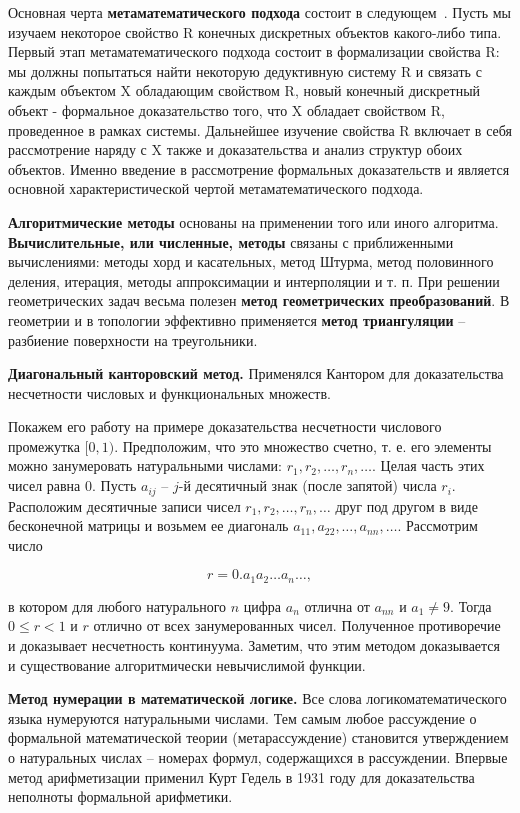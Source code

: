 Основная черта \textbf{метаматематического подхода} состоит в следующем~\cite{матиясевич1975метаматематическом}. Пусть мы изучаем некоторое свойство R конечных дискретных объектов какого-либо типа. Первый этап метаматематического подхода состоит в формализации свойства R: мы должны попытаться найти некоторую дедуктивную систему R и связать с каждым объектом X обладающим свойством R, новый конечный дискретный объект - формальное доказательство того, что X обладает свойством R, проведенное в рамках системы. Дальнейшее изучение свойства R включает в себя рассмотрение наряду с X также и доказательства и анализ структур обоих объектов. Именно введение в рассмотрение формальных доказательств и является основной характеристической чертой метаматематического подхода. 

\textbf{Алгоритмические методы} основаны на применении того или иного алгоритма. \textbf{Вычислительные, или численные, методы} связаны с приближенными вычислениями: методы хорд и касательных, метод Штурма, метод половинного деления, итерация, методы аппроксимации и интерполяции и т. п. При решении геометрических задач весьма полезен \textbf{метод геометрических преобразований}. В геометрии и в топологии эффективно применяется \textbf{метод триангуляции} – разбиение поверхности на треугольники.

\textbf{Диагональный канторовский метод.} Применялся Кантором для доказательства несчетности числовых и функциональных множеств.

Покажем его работу на примере доказательства несчетности числового промежутка \([0, 1)\). Предположим, что это множество счетно, т. е. его элементы можно занумеровать натуральными числами: \( r_1, r_2, \ldots, r_n, \ldots \). Целая часть этих чисел равна 0. Пусть \( a_{ij} \) – \( j \)-й десятичный знак (после запятой) числа \( r_i \). Расположим десятичные записи чисел \( r_1, r_2, \ldots, r_n, \ldots \) друг под другом в виде бесконечной матрицы и возьмем ее диагональ \( a_{11}, a_{22}, \ldots, a_{nn}, \ldots \). Рассмотрим число 

\[
r = 0.a_1 a_2 \ldots a_n \ldots,
\] 

в котором для любого натурального \( n \) цифра \( a_n \) отлична от \( a_{nn} \) и \( a_1 \neq 9 \). Тогда \( 0 \leq r < 1 \) и \( r \) отлично от всех занумерованных чисел. Полученное противоречие и доказывает несчетность континуума. Заметим, что этим методом доказывается и существование алгоритмически невычислимой функции.


\textbf{Метод нумерации в математической логике.} Все слова логикоматематического языка нумеруются натуральными числами. Тем самым любое рассуждение о формальной математической теории (метарассуждение) становится утверждением о натуральных числах – номерах формул, содержащихся в рассуждении. Впервые метод арифметизации применил Курт Гедель в 1931 году для доказательства неполноты формальной арифметики.



